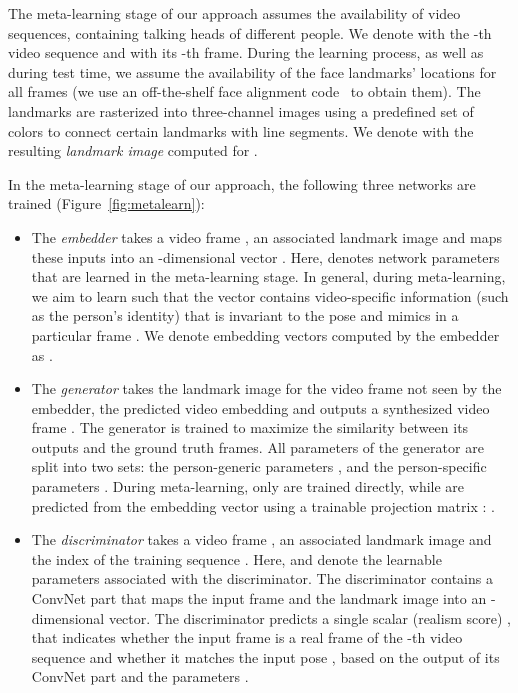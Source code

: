 \documentclass[10pt,twocolumn,letterpaper]{article}
\newcommand{\fig}[1]{Figure~\ref{fig:#1}}
\begin{document}
The meta-learning stage of our approach assumes the availability of  video sequences, containing talking heads of different people. We denote with  the -th video sequence and with  its -th frame. During the learning process, as well as during test time, we assume the availability of the face landmarks' locations for all frames (we use an off-the-shelf face alignment code~\cite{Bulat17} to obtain them). The landmarks are rasterized into three-channel images using a predefined set of colors to connect certain landmarks with line segments. We denote with  the resulting \textit{landmark image} computed for .

In the meta-learning stage of our approach, the following three networks are trained (\fig{metalearn}):
\begin{itemize}[noitemsep,nolistsep,leftmargin=*]
    \item The \textit{embedder}   takes a video frame , an associated landmark image  and maps these inputs into an -dimensional vector . Here,  denotes network parameters that are learned in the meta-learning stage. In general, during meta-learning, we aim to learn  such that the vector  contains video-specific information (such as the person's identity) that is invariant to the pose and mimics in a particular frame . We denote embedding vectors computed by the embedder as .
    
    \item The \textit{generator}   takes the landmark image  for the video frame not seen by the embedder, the predicted video embedding  and outputs a synthesized video frame . The generator is trained to maximize the similarity between its outputs and the ground truth frames. All parameters of the generator are split into two sets: the person-generic parameters , and the person-specific parameters . During meta-learning, only  are trained directly, while  are predicted from the embedding vector  using a trainable projection matrix : .
    
    \item The \textit{discriminator}  takes a video frame , an associated landmark image  and the index of the training sequence . Here,  and  denote the learnable parameters associated with the discriminator.  The discriminator contains a ConvNet part  that maps the input frame and the landmark image into an -dimensional vector. The discriminator predicts a single scalar (realism score) , that indicates whether the input frame  is a real frame of the -th video sequence and whether it matches the input pose , based on the output of its ConvNet part and the parameters .
\end{itemize}
\end{document}
